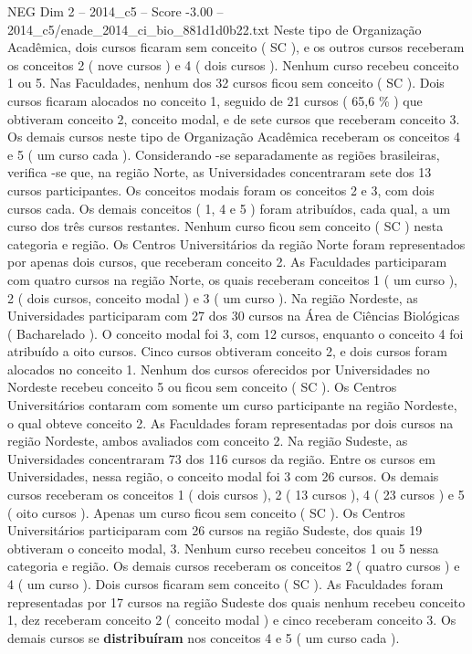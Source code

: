 \begin{textsample}{NEG Dim 2 – 2014\_c5 – Score -3.00 – 2014\_c5/enade\_2014\_ci\_bio\_881d1d0b22.txt}
Neste tipo de Organização Acadêmica, dois cursos ficaram sem conceito ( SC ), e os outros cursos receberam os conceitos 2 ( nove cursos ) e 4 ( dois cursos ).
Nenhum curso recebeu conceito 1 ou 5.
Nas Faculdades, nenhum dos 32 cursos ficou sem conceito ( SC ).
Dois cursos ficaram alocados no conceito 1, seguido de 21 cursos ( 65,6 \% ) que obtiveram conceito 2, conceito modal, e de sete cursos que receberam conceito 3.
Os demais cursos neste tipo de Organização Acadêmica receberam os conceitos 4 e 5 ( um curso cada ).
Considerando -se separadamente as regiões brasileiras, verifica -se que, na região Norte, as Universidades concentraram sete dos 13 cursos participantes.
Os conceitos modais foram os conceitos 2 e 3, com dois cursos cada.
Os demais conceitos ( 1, 4 e 5 ) foram atribuídos, cada qual, a um curso dos três cursos restantes.
Nenhum curso ficou sem conceito ( SC ) nesta categoria e região.
Os Centros Universitários da região Norte foram representados por apenas dois cursos, que receberam conceito 2.
As Faculdades participaram com quatro cursos na região Norte, os quais receberam conceitos 1 ( um curso ), 2 ( dois cursos, conceito modal ) e 3 ( um curso ).
Na região Nordeste, as Universidades participaram com 27 dos 30 cursos na Área de Ciências Biológicas ( Bacharelado ).
O conceito modal foi 3, com 12 cursos, enquanto o conceito 4 foi atribuído a oito cursos.
Cinco cursos obtiveram conceito 2, e dois cursos foram alocados no conceito 1.
Nenhum dos cursos oferecidos por Universidades no Nordeste recebeu conceito 5 ou ficou sem conceito ( SC ).
Os Centros Universitários contaram com somente um curso participante na região Nordeste, o qual obteve conceito 2.
As Faculdades foram representadas por dois cursos na região Nordeste, ambos avaliados com conceito 2.
Na região Sudeste, as Universidades concentraram 73 dos 116 cursos da região.
Entre os cursos em Universidades, nessa região, o conceito modal foi 3 com 26 cursos.
Os demais cursos receberam os conceitos 1 ( dois cursos ), 2 ( 13 cursos ), 4 ( 23 cursos ) e 5 ( oito cursos ).
Apenas um curso ficou sem conceito ( SC ).
Os Centros Universitários participaram com 26 cursos na região Sudeste, dos quais 19 obtiveram o conceito modal, 3.
Nenhum curso recebeu conceitos 1 ou 5 nessa categoria e região.
Os demais cursos receberam os conceitos 2 ( quatro cursos ) e 4 ( um curso ).
Dois cursos ficaram sem conceito ( SC ).
As Faculdades foram representadas por 17 cursos na região Sudeste dos quais nenhum recebeu conceito 1, dez receberam conceito 2 ( conceito modal ) e cinco receberam conceito 3.
Os demais cursos se \textbf{distribuíram} nos conceitos 4 e 5 ( um curso cada ).

\end{textsample}
